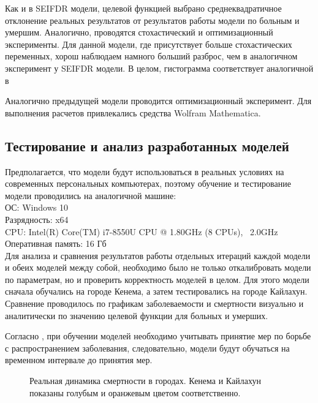Как и в SEIFDR модели, целевой функцией выбрано среднеквадратичное отклонение реальных результатов от результатов работы модели по  больным и умершим. Аналогично, проводятся стохастический и оптимизационный эксперименты. 
Для данной модели, где присутствует больше стохастических переменных, хорош наблюдаем намного больший разброс, чем в аналогичном эксперимент у SEIFDR модели. В целом, гистограмма соответствует аналогичной в \cite[с. 25]{Bykova:2015}

Аналогично предыдущей модели проводится оптимизационный эксперимент. Для выполнения расчетов привлекались средства Wolfram Mathematica.

\subsection{Тестирование и анализ разработанных моделей}

Предполагается, что модели будут использоваться в реальных условиях на современных персональных компьютерах, поэтому обучение и тестирование модели проводились на аналогичной машине: \\
ОС: Windows 10 \\
Разрядность: x64 \\
CPU: Intel(R) Core(TM) i7-8550U CPU @ 1.80GHz (8 CPUs), ~2.0GHz \\
Оперативная память: 16 Гб \\

Для анализа и сравнения результатов работы отдельных итераций каждой модели и обеих моделей между собой, необходимо было не только откалибровать модели по параметрам, но и проверить корректность моделей в целом. Для этого модели сначала обучались на  городе Кенема, а затем тестировались на городе Кайлахун. Сравнение проводилось по графикам заболеваемости и смертности визуально  и аналитически по значению целевой функции для больных и умерших. 

Согласно %
\cite{Bykova:2015}, при обучении моделей необходимо учитывать принятие мер по борьбе с распространением заболевания, следовательно, модели будут обучаться на временном интервале до принятия мер.


\begin{figure}[H] 
	\caption{Реальная динамика смертности в городах. Кенема и Кайлахун показаны голубым и оранжевым цветом соответственно.}
	\label{RealDeadData}
\end{figure}



